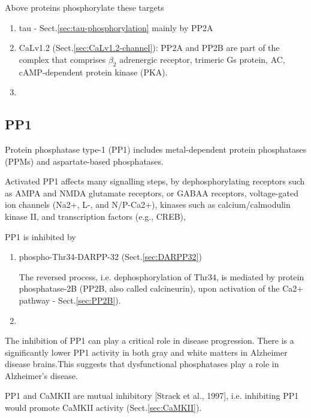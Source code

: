 Above proteins phosphorylate these targets
\begin{enumerate}
  \item tau - Sect.\ref{sec:tau-phosphorylation} mainly by PP2A
  
  \item CaLv1.2 (Sect.\ref{sec:CaLv1.2-channel}): PP2A and PP2B are part of the
  complex that comprises $\beta_2$ adrenergic receptor, trimeric Gs protein, AC,
cAMP-dependent protein kinase (PKA).

  \item 
\end{enumerate}


\subsection{PP1 }
\label{sec:PP1}

Protein phosphatase type-1 (PP1) includes metal-dependent protein phosphatases
(PPMs) and aspartate-based phosphatases.

Activated PP1  affects many signalling steps, by dephosphorylating receptors
such as AMPA and NMDA glutamate receptors, or GABAA receptors, voltage-gated ion
channels (Na2+, L-, and N/P-Ca2+), kinases such as calcium/calmodulin kinase II,
and transcription factors (e.g., CREB),

PP1 is inhibited by 
\begin{enumerate}
  \item phospho-Thr34-DARPP-32 (Sect.\ref{sec:DARPP32})
  
The reversed process, i.e. dephosphorylation of Thr34, is mediated by
protein phosphatase-2B (PP2B, also called calcineurin), upon activation of the
Ca2+ pathway - Sect.\ref{sec:PP2B}). 
  \item 
\end{enumerate}

The inhibition of PP1 can play a critical role in disease progression.
There is a significantly lower PP1 activity in both gray and white matters in
Alzheimer disease brains.This suggests that dysfunctional phosphatases play a
role in Alzheimer's disease.

PP1 and CaMKII are mutual inhibitory [Strack et al., 1997], i.e. inhibiting PP1
would promote CaMKII activity (Sect.\ref{sec:CaMKII}).


